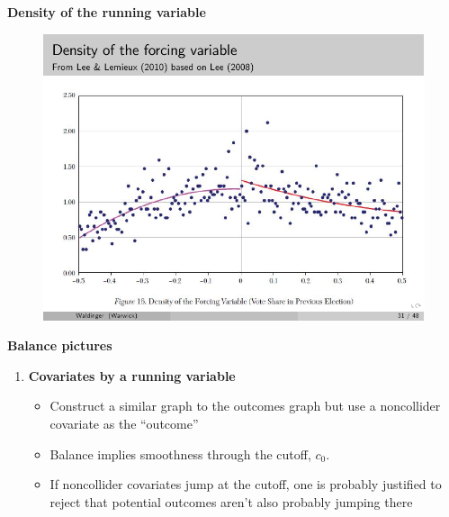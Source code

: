 \documentclass[notes=show]{beamer}
\begin{document}
\begin{frame}[plain]
	\begin{center}
	\textbf{Density of the running variable}
	\end{center}
	
	\begin{figure}
	\includegraphics[scale=0.75]{./lecture_includes/rdd_33.pdf}
	\end{figure}
	
\end{frame}

\begin{frame}[plain]
\begin{center}
\textbf{Balance pictures}
\end{center}

\begin{enumerate}\addtocounter{enumi}{3}
	\item \textbf{Covariates by a running variable}
		\begin{itemize}
		\item Construct a similar graph to the outcomes graph but use a noncollider covariate as the ``outcome''
		\item Balance implies smoothness through the cutoff, $c_0$.  
		\item If noncollider covariates jump at the cutoff, one is probably justified to reject that potential outcomes aren't also probably jumping there
		\end{itemize}
	\end{enumerate}
\end{frame}
\end{document}

